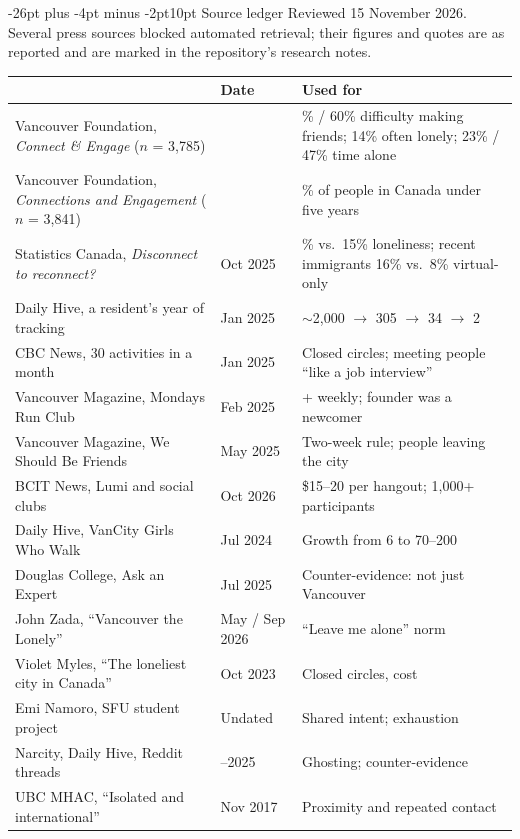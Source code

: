 \documentclass[11pt,letterpaper]{article}
\makeatletter
\newcommand{\condbreak}[1]{\par\vskip 0pt plus #1\penalty-200\vskip 0pt plus -#1\relax}
\renewcommand{\section}{\condbreak{2.6in}\@startsection{section}{1}{0pt}%
  {-26pt plus -4pt minus -2pt}{10pt}%
  {\sffamily\Large\bfseries\color{ink}}}
\newcommand{\colhead}[1]{{\sffamily\footnotesize\bfseries\color{muted}#1}}
\makeatother
\begin{document}
\section{Source ledger}
Reviewed 15 November 2026. Several press sources blocked automated retrieval; their figures and quotes are as reported and are marked in the repository's research notes.
{\footnotesize
\begin{longtable}{@{}>{\raggedright\arraybackslash}p{2.0in} >{\raggedright\arraybackslash}p{0.85in} >{\raggedright\arraybackslash}p{3.1in}@{}}
\toprule
\colhead{Source} & \colhead{Date} & \colhead{Used for}\\
\midrule
\endhead
Vancouver Foundation, \emph{Connect \& Engage} ($n$ = 3,785) & 2017 & 67\% / 60\% difficulty making friends; 14\% often lonely; 23\% / 47\% time alone\\
Vancouver Foundation, \emph{Connections and Engagement} ($n$ = 3,841) & 2012 & 50\% of people in Canada under five years\\
Statistics Canada, \emph{Disconnect to reconnect?} & Oct 2025 & 24\% vs.\ 15\% loneliness; recent immigrants 16\% vs.\ 8\% virtual-only\\
Daily Hive, a resident's year of tracking & Jan 2025 & $\sim$2,000 $\to$ 305 $\to$ 34 $\to$ 2\\
CBC News, 30 activities in a month & Jan 2025 & Closed circles; meeting people ``like a job interview''\\
Vancouver Magazine, Mondays Run Club & Feb 2025 & 150+ weekly; founder was a newcomer\\
Vancouver Magazine, We Should Be Friends & May 2025 & Two-week rule; people leaving the city\\
BCIT News, Lumi and social clubs & Oct 2026 & \$15--20 per hangout; 1,000+ participants\\
Daily Hive, VanCity Girls Who Walk & Jul 2024 & Growth from 6 to 70--200\\
Douglas College, Ask an Expert & Jul 2025 & Counter-evidence: not just Vancouver\\
John Zada, ``Vancouver the Lonely'' & May / Sep 2026 & ``Leave me alone'' norm\\
Violet Myles, ``The loneliest city in Canada'' & Oct 2023 & Closed circles, cost\\
Emi Namoro, SFU student project & Undated & Shared intent; exhaustion\\
Narcity, Daily Hive, Reddit threads & 2021--2025 & Ghosting; counter-evidence\\
UBC MHAC, ``Isolated and international'' & Nov 2017 & Proximity and repeated contact\\
\bottomrule
\end{longtable}}
\end{document}
